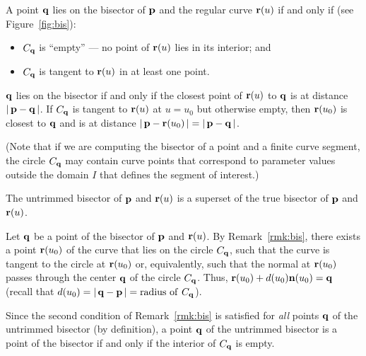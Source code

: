 \begin{rmk}
\label{rmk:bis}
{\rm
A point ${\bf q}$ lies on the bisector of ${\bf p}$ and the regular
curve ${\bf r}(u)$ if and only if (see Figure~\ref{fig:bis}):
\begin{itemize}
\item
$C_{\bf q}$ is ``empty'' --- no point of ${\bf r}(u)$ lies in its
interior; and
\item
$C_{\bf q}$ is tangent to ${\bf r}(u)$ in at least one point.
\end{itemize}
}
\end{rmk}
\prf
${\bf q}$ lies on the bisector if and only if the closest point
of ${\bf r}(u)$ to ${\bf q}$ is at distance $|\,{\bf p}-{\bf q}\,|$.
If $C_{\bf q}$ is tangent to ${\bf r}(u)$ at $u=u_0$ but otherwise
empty, then ${\bf r}(u_0)$ is closest to ${\bf q}$ and is at distance
$|\,{\bf p}-{\bf r}(u_0)\,|=|\,{\bf p}-{\bf q}\,|$.
\QED


(Note that if we are computing the bisector of a point and a finite
curve segment, the circle $C_{\bf q}$ may contain curve points that
correspond to parameter values outside the domain $I$ that defines
the segment of interest.)

\begin{propn}
\label{p:superset}
The untrimmed bisector of ${\bf p}$ and ${\bf r}(u)$ is a superset
of the true bisector of ${\bf p}$ and ${\bf r}(u)$.
\end{propn}
\prf
Let ${\bf q}$ be a point of the bisector of ${\bf p}$ and ${\bf r}(u)$.
By Remark~\ref{rmk:bis}, there exists a point ${\bf r}(u_{0})$ of the
curve that lies on the circle $C_{\bf q}$, such that the curve is tangent
to the circle at ${\bf r}(u_{0})$ or, equivalently, such that the normal
at ${\bf r}(u_{0})$ passes through the center ${\bf q}$ of the circle
$C_{\bf q}$. Thus, ${\bf r}(u_{0}) + d(u_{0}){\bf n}(u_{0}) = {\bf q}$
(recall that $d(u_0)=|\,{\bf q}-{\bf p}\,|={\rm radius\ of\ } C_{\bf q}$).
\QED

Since the second condition of Remark~\ref{rmk:bis} is satisfied for
{\it all\/} points ${\bf q}$ of the untrimmed bisector (by definition),
a point ${\bf q}$ of the untrimmed bisector is a point of the bisector
if and only if the interior of $C_{\bf q}$ is empty.

